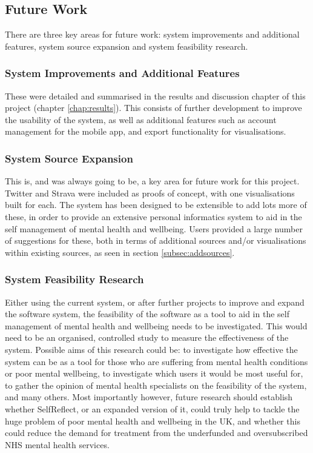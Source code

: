 \documentclass[11pt,openright,a4paper]{report}
\begin{document}
\subsection{Future Work}
There are three key areas for future work: system improvements and additional features, system source expansion and system feasibility research.

\subsubsection{System Improvements and Additional Features}
These were detailed and summarised in the results and discussion chapter of this project (chapter \ref{chap:results}). This consists of further development to improve the usability of the system, as well as additional features such as account management for the mobile app, and export functionality for visualisations.

\subsubsection{System Source Expansion}
This is, and was always going to be, a key area for future work for this project. Twitter and Strava were included as proofs of concept, with one visualisations built for each. The system has been designed to be extensible to add lots more of these, in order to provide an extensive personal informatics system to aid in the self management of mental health and wellbeing. Users provided a large number of suggestions for these, both in terms of additional sources and/or visualisations within existing sources, as seen in section \ref{subsec:addsources}.

\subsubsection{System Feasibility Research}
Either using the current system, or after further projects to improve and expand the software system, the feasibility of the software as a tool to aid in the self management of mental health and wellbeing needs to be investigated. This would need to be an organised, controlled study to measure the effectiveness of the system. Possible aims of this research could be: to investigate how effective the system can be as a tool for those who are suffering from mental health conditions or poor mental wellbeing, to investigate which users it would be most useful for, to gather the opinion of mental health specialists on the feasibility of the system, and many others. Most importantly however, future research should establish whether SelfReflect, or an expanded version of it, could truly help to tackle the huge problem of poor mental health and wellbeing in the UK, and whether this could reduce the demand for treatment from the underfunded and oversubscribed NHS mental health services.
\end{document}
